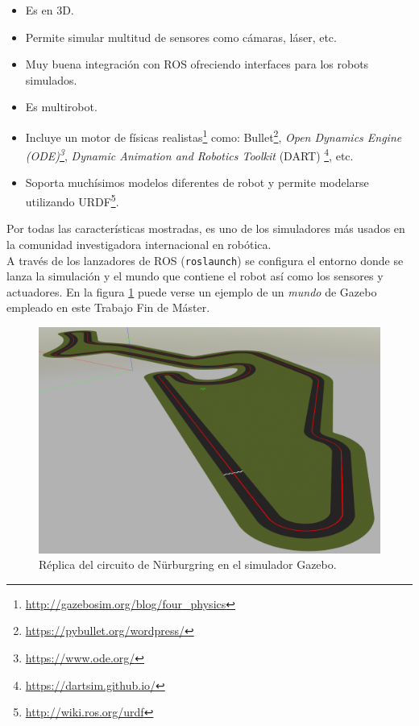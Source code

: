 \begin{itemize}
    \item Es en 3D.
    \item Permite simular multitud de sensores como cámaras, láser, etc.
    \item Muy buena integración con ROS ofreciendo interfaces para los robots simulados.
    \item Es multirobot.
    \item Incluye un motor de físicas realistas\footnote{\url{http://gazebosim.org/blog/four_physics}} como: Bullet\footnote{\url{https://pybullet.org/wordpress/}}, \textit{Open Dynamics Engine (ODE)\footnote{\url{https://www.ode.org/}}}, \textit{Dynamic Animation and Robotics Toolkit} (DART) \footnote{\url{https://dartsim.github.io/}}, etc.
    \item Soporta muchísimos modelos diferentes de robot y permite modelarse utilizando URDF\footnote{\url{http://wiki.ros.org/urdf}}.\\
\end{itemize}

Por todas las características mostradas, es uno de los simuladores más usados en la comunidad investigadora internacional en robótica.\\

A través de los lanzadores de ROS (\texttt{roslaunch}) se configura el entorno donde se lanza la simulación y el mundo que contiene el robot así como los sensores y actuadores. En la figura \ref{fig:gazebo-nurburgring} puede verse un ejemplo de un \textit{mundo} de Gazebo empleado en este Trabajo Fin de Máster.

\begin{figure}[!ht]
    \centering \includegraphics[width=0.5\columnwidth]{./figures/chapter_3/nurburgring.png}
    \caption{Réplica del circuito de Nürburgring en el simulador Gazebo.\label{fig:gazebo-nurburgring}}
\end{figure}


